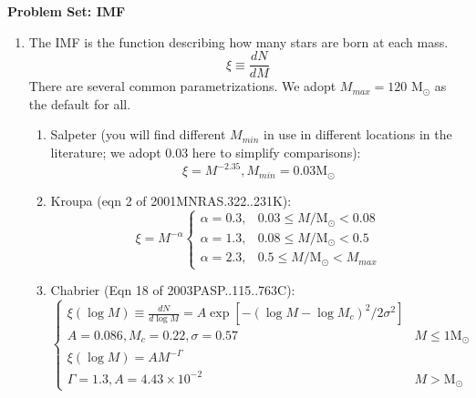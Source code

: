 \documentclass{article}
\newcommand{\msun}{\ensuremath{\mathrm{M}_\odot}\xspace}
\begin{document}
\noindent\textbf{Problem Set: IMF}

\begin{enumerate}
    \item The IMF is the function describing how many stars are born at each mass.
        \begin{equation}
            \xi \equiv \frac{dN}{dM}
        \end{equation}
        There are several common parametrizations.  We adopt $M_{max} = 120$ \msun
        as the default for all.
        \begin{enumerate}
            \item Salpeter (you will find different $M_{min}$ in use in
                different locations in the literature; we adopt 0.03 here
                to simplify comparisons):
            \begin{equation}
                \xi = M^{-2.35}, M_{min}=0.03 \msun
            \end{equation}

            \item Kroupa (eqn 2 of 2001MNRAS.322..231K):\\
            $$ \xi = M^{-\alpha}
            \begin{cases}
                  \alpha=0.3, & 0.03 \leq M/\msun < 0.08 \\
                  \alpha=1.3, & 0.08 \leq M/\msun < 0.5 \\
                  \alpha=2.3, & 0.5 \leq M/\msun < M_{max}
            \end{cases}
            $$

            \item Chabrier (Eqn 18 of 2003PASP..115..763C):\\
                $$
            \begin{cases}
                \xi(\log M) \equiv \frac{dN}{d\log M} = A \exp\left[-(\log M - \log M_c)^2/2\sigma^2\right]  \\
                A = 0.086, M_c = 0.22, \sigma=0.57 &  M\leq1 \msun\\
                \xi(\log M) = A M^{-\Gamma}   \\
                \Gamma = 1.3, A = 4.43\times10^{-2} & M>\msun
            \end{cases}
            $$


        \end{enumerate}


\end{enumerate}
\end{document}
